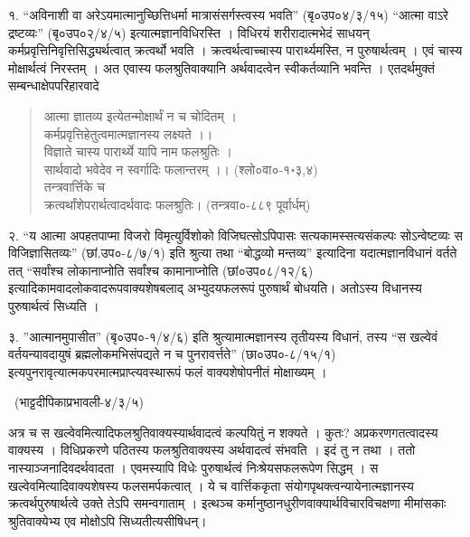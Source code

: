 १. “अविनाशी वा अरेऽयमात्मानुच्छित्तिधर्मा मात्रासंसर्गस्त्वस्य भवति” (बृ०उप०४/३/१५) “आत्मा वाऽरे द्रष्टव्यः” (बृ०उप०२/४/५) इत्यात्मज्ञानविधिरस्ति । विधिरयं शरीरादात्मभेदं साधयन् कर्मप्रवृत्तिनिवृत्तिसिद्ध्यर्थत्वात् क्रत्वर्थो भवति । क्रत्वर्थत्वाच्चास्य पारार्थ्यमस्ति, न पुरुषार्थत्वम् । एवं चास्य मोक्षार्थत्वं निरस्तम् । अत एवास्य फलश्रुतिवाक्यानि अर्थवादत्वेन स्वीकर्तव्यानि भवन्ति । एतदर्थमुक्तं सम्बन्धाक्षेपपरिहारवादे
\begin{verse}
आत्मा ज्ञातव्य इत्येतन्मोक्षार्थं न च चोदितम् ।\\
कर्मप्रवृत्तिहेतुत्वमात्मज्ञानस्य लक्ष्यते ।।\\
विज्ञाते चास्य पारार्थ्ये यापि नाम फलश्रुतिः ।\\
सार्थवादो भवेदेव न स्वर्गादिः फलान्तरम् ।। (श्लो०वा०-१॰३,४)\\
तन्त्रवार्त्तिके च\\
क्रत्वर्थांशेपरार्थत्वादर्थवादः फलश्रुतिः। (तन्त्रवा०-८८९ पूर्वार्धम्)
\end{verse}

२. “य आत्मा अपहतपाप्मा विजरो विमृत्युर्विशोको विजिघत्सोऽपिपासः सत्यकामस्सत्यसंकल्पः सोऽन्वेष्टव्यः स विजिज्ञासितव्यः” (छां.उप०-८/७/१) इति श्रुत्या तथा “बोद्धव्यो मन्तव्य” इत्यादिना यदात्मज्ञानविधानं वर्तते तत् “सर्वांश्च लोकानाप्नोति सर्वांश्च कामानाप्नोति (छां०उप०८/१२/६) इत्यादिकामवादलोकवादरूपवाक्यशेषबलाद् अभ्युदयफलरूपं पुरुषार्थं बोधयति। अतोऽस्य विधानस्य पुरुषार्थत्वं सिध्यति ।

३. ”आत्मानमुपासीत” (बृ०उप०-१/४/६) इति श्रुत्यामात्मज्ञानस्य तृतीयस्य विधानं, तस्य “स खल्वेवं वर्तयन्यावदायुषं ब्रह्मलोकमभिसंपद्यते न च पुनरावर्त्तते” (छा०उप०-८/१५/१) इत्यपुनरावृत्यात्मकपरमात्मप्राप्त्यवस्थारूपं फलं वाक्यशेषोपनीतं मोक्षाख्यम् । 

~\hfill (भाट्टदीपिकाप्रभावली-४/३/५) 

अत्र च स खल्वेवमित्यादिफलश्रुतिवाक्यस्यार्थवादत्वं कल्पयितुं न शक्यते । कुतः? अप्रकरणगतत्वादस्य वाक्यस्य । विधिप्रकरणे पठितस्य फलश्रुतिवाक्यस्य अर्थवादत्वं संभवति । इदं तु न तथा । ततो नास्याञ्जनादिवदर्थवादता । एवमस्यापि विधेः पुरुषार्थत्वं निःश्रेयसफलरूपेण सिद्धम् । स खल्वेवमित्यादिवाक्यशेषस्य फलसमर्पकत्वात् । ये च वार्त्तिककृता संयोगपृथक्त्वन्यायेनात्मज्ञानस्य क्रत्वर्थपुरुषार्थत्वे उक्ते तेऽपि समन्वगाताम् । इत्थञ्च कर्मानुष्ठानधुरीणवाक्यार्थविचारविचक्षणा मीमांसकाः श्रुतिवाक्येभ्य एव मोक्षोऽपि सिध्यतीत्यसीषिधन्।

